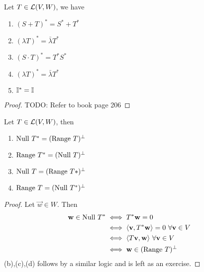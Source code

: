 \begin{theorem}
Let $T \in \mathcal L(V,W)$, we have
	\begin{enumerate}
		\item $(S + T)^* = S^* + T^*$
		\item $(\lambda T)^* = \bar \lambda T^*$
		\item $(S \cdot T)^* = T^*S^*$
		\item $(\lambda T)^* = \bar \lambda T^*$
		\item $\mathbb I^* = \mathbb I$
	\end{enumerate}
\end{theorem}
\begin{proof} TODO: Refer to book page 206
\end{proof}
\begin{theorem}
Let $T \in \mathcal L(V,W)$, then
	\begin{enumerate}
		\item $\text{Null } T^* = (\text{Range } T)^\perp$
		\item $\text{Range } T^* = (\text{Null } T)^\perp$
		\item $\text{Null } T = (\text{Range } T*)^\perp$
		\item $\text{Range } T = (\text{Null } T^*)^\perp$
	\end{enumerate}
\end{theorem}
\begin{proof}
Let $\vec w \in W$. Then 
\begin{align*}
	\mathbf w \in \text{Null } T^* &\iff T^* \mathbf w = 0 \\
	&\iff \langle \mathbf v, T^* \mathbf w \rangle = 0 \ \forall \mathbf v \in V \\
	&\iff \langle T\mathbf v, \mathbf w \rangle \ \forall \mathbf v \in V \\
	&\iff \mathbf w \in (\text{Range } T)^\perp
\end{align*}
(b),(c),(d) follows by a similar logic and is left as an exercise.
\end{proof}

